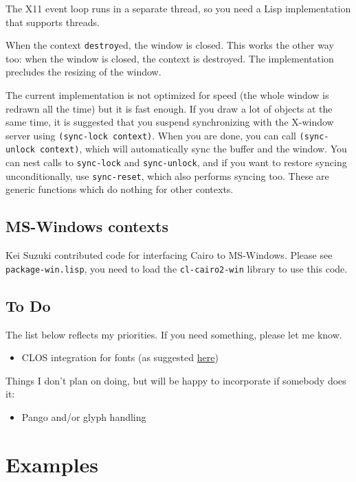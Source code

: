 \documentclass[12pt,letterpaper,dvipdfm]{article}
\begin{document}
The X11 event loop runs in a separate thread, so you need a Lisp
implementation that supports threads.  

When the context \lstinline!destroy!ed, the window is closed.  This
works the other way too: when the window is closed, the context is
destroyed.  The implementation precludes the resizing of the window.

The current implementation is not optimized for speed (the whole
window is redrawn all the time) but it is fast enough.  If you draw a
lot of objects at the same time, it is suggested that you suspend
synchronizing with the X-window server using 
\lstinline!(sync-lock context)!.  When you are done, you can call
\lstinline!(sync-unlock context)!, which will automatically sync the
buffer and the window.
You can nest calls to \lstinline!sync-lock!  and
\lstinline!sync-unlock!, and if you want to restore syncing
unconditionally, use \lstinline!sync-reset!, which also performs
syncing too.  These are generic functions which do nothing for other
contexts.

\subsection{MS-Windows contexts}
\label{sec:ms-windows-contexts}

Kei Suzuki contributed code for interfacing Cairo to MS-Windows.
Please see \verb!package-win.lisp!, you need to load the
\lstinline!cl-cairo2-win! library to use this code.

\subsection{To Do}
\label{sec:todo}

The list below reflects my priorities.  If you need something, please
let me know.
\begin{itemize}
\item CLOS integration for fonts (as suggested
  \href{http://www.cairographics.org/manual/bindings-fonts.html}{here})
\end{itemize}

Things I don't plan on doing, but will be happy to incorporate if
somebody does it:
\begin{itemize}
\item Pango and/or glyph handling
\end{itemize}


\section{Examples}
\label{sec:examples}
\end{document}
